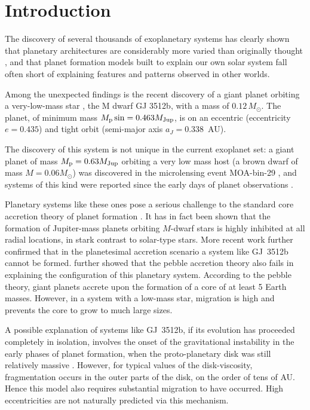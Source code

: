 \documentclass[twocolumn]{aastex62}
\begin{document}
\section{Introduction}
\citet{Larsen09a}
The discovery of several thousands of exoplanetary systems
has clearly shown that planetary architectures are
considerably more varied than originally thought \citep{Bathala2013}, and
that planet formation models built to explain our
own solar system fall often short of explaining
features and patterns observed in other worlds.

Among the unexpected findings is the recent
discovery of a giant planet orbiting a very-low-mass
star \citep{Morales2019}, the M dwarf GJ 3512b, with a mass of $0.12\,M_\odot$.
The planet, of minimum mass $M_{\rm p}\sin =0.463M_{\rm Jup}$, 
is on an eccentric (eccentricity $e=0.435$) and
tight orbit (semi-major axis $a_J=0.338$~AU).

The discovery of this system is not unique in the current exoplanet set: a giant planet of mass $M_{\rm p}=0.63 M_{\rm Jup}$ 
orbiting a very low mass host (a brown dwarf of mass $M=0.06 M_\odot$) was discovered in the microlensing event MOA-bin-29 \citep{Kondo2019}, and systems of this kind were reported since the early days of planet observations \citep{Delfosse1998}.

Planetary systems like these ones pose a serious challenge to the standard core accretion theory of planet formation \citep{Mizuno1980,
Bodenheimer1986,
Laughlin2004}.
It has in fact been shown \citep{Laughlin2004} that the formation of Jupiter-mass planets orbiting $M$-dwarf stars is highly inhibited at all radial locations, in stark contrast to solar-type stars. 
More recent work \citep{Miguel2019} further confirmed that in the planetesimal accretion scenario a system like GJ~3512b cannot be formed.
\citet{Morales2019} further showed that the pebble accretion theory \citep{Johansen2019} also fails in explaining the configuration of this planetary  system. According to the pebble theory, giant planets accrete upon the formation of a core of at least 5 Earth masses. However, in a system with a low-mass star, migration is high and prevents the core to grow to much large sizes.

A possible explanation of systems like GJ~3512b, if its evolution has
proceeded completely in isolation, involves the onset of the
gravitational instability in the early phases of planet formation,
when the proto-planetary disk was still relatively massive
\citep{Lodato2005,Boss2006,Morales2019}. However, for typical values of the disk-viscosity,
fragmentation occurs in the outer parts of the disk, on the order of
tens of AU.  Hence this model also requires substantial migration to
have occurred. High eccentricities are not naturally predicted
via this mechanism.
\end{document}
